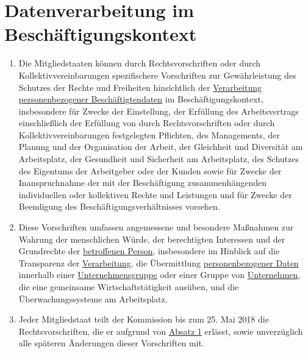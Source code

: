 \chapter{Datenverarbeitung im Beschäftigungskontext}
\label{ch:88}


\begin{enumerate}

  \item Die Mitgliedstaaten können durch Rechtsvorschriften oder durch Kollektivvereinbarungen spezifischere
   Vorschriften zur Gewährleistung des Schutzes der Rechte und Freiheiten hinsichtlich der \hyperref[itm:04-2]
   {Verarbeitung}
   \hyperref[itm:04-1]{personenbezogener Beschäftigtendaten} im Beschäftigungskontext, insbesondere für Zwecke der
    Einstellung, der Erfüllung des Arbeitsvertrags einschließlich der Erfüllung von durch Rechtsvorschriften oder durch
    Kollektivvereinbarungen festgelegten Pflichten, des Managements, der Planung und der Organisation der Arbeit, der
    Gleichheit und Diversität am Arbeitsplatz, der Gesundheit und Sicherheit am Arbeitsplatz, des Schutzes des
    Eigentums der Arbeitgeber oder der Kunden sowie für Zwecke der Inanspruchnahme der mit der Beschäftigung
    zusammenhängenden individuellen oder kollektiven Rechte und Leistungen und für Zwecke der Beendigung des
    Beschäftigungsverhältnisses vorsehen.
  \label{itm:88-1}

  \item Diese Vorschriften umfassen angemessene und besondere Maßnahmen zur Wahrung der menschlichen Würde, der
   berechtigten Interessen und der Grundrechte der \hyperref[itm:04-1]{betroffenen Person}, insbesondere im Hinblick
   auf die Transparenz der
   \hyperref[itm:04-2]{Verarbeitung}, die Übermittlung \hyperref[itm:04-1]{personenbezogener Daten} innerhalb
    einer \hyperref[itm:04-19]{Unternehmensgruppe} oder einer Gruppe von
   \hyperref[itm:04-18]{Unternehmen}, die eine gemeinsame Wirtschaftstätigkeit ausüben, und die Überwachungssysteme am
    Arbeitsplatz.
  \label{itm:88-2}

  \item Jeder Mitgliedstaat teilt der Kommission bis zum 25. Mai 2018 die Rechtsvorschriften, die er aufgrund von
   \hyperref[itm:88-1]{Absatz 1} erlässt, sowie unverzüglich alle späteren Änderungen dieser Vorschriften mit.
  \label{itm:88-3}

\end{enumerate}


